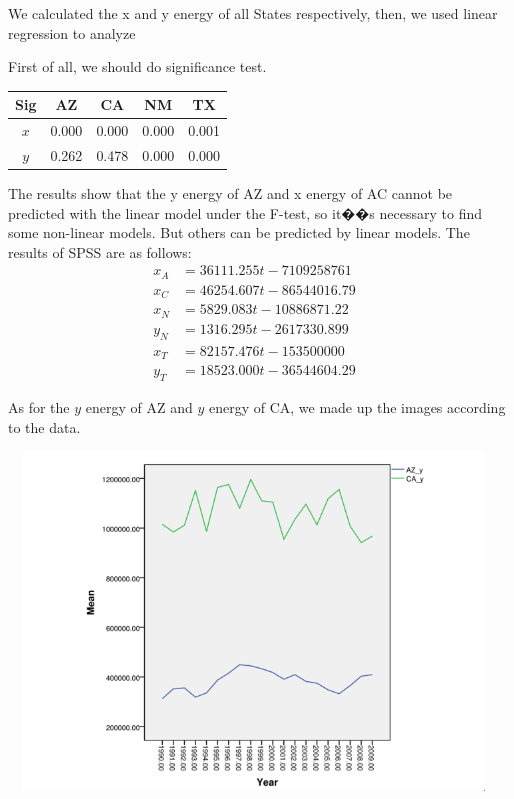 \documentclass[12pt]{article}
\begin{document}
We calculated the x and y energy of all States respectively, then, we used linear regression to analyze

First of all, we should do significance test.



\begin{table}[!h]\centering
\begin{tabular}{|c|c|c|c|c| }
\hline
Sig&	AZ	&CA&	NM	&TX\\
\hline
$x$	&0.000 &	0.000 &	0.000 &	0.001\\
\hline
$y$	&0.262 &	0.478 &	0.000 	&0.000\\

\hline
\end{tabular}
\end{table}

The results show that the y energy of AZ and x energy of AC cannot be predicted with the linear model under the F-test, so it��s necessary to find some non-linear models. But others can be predicted by linear models. The results of SPSS are as follows:
\begin{align*}
x_{A}&=36111.255t-7109258761&\\
x_{C}&=46254.607t-86544016.79&\\
x_{N}&=5829.083t-10886871.22&\\
y_{N}&=1316.295t-2617330.899&\\
x_{T}&=82157.476t-153500000&\\
y_{T}&=18523.000t-36544604.29&
\end{align*}


As for the $y$ energy of AZ and $y$ energy of CA, we made up the images according to the data.

\includegraphics[width=13cm,height=9cm]{d1.png}
\end{document}
